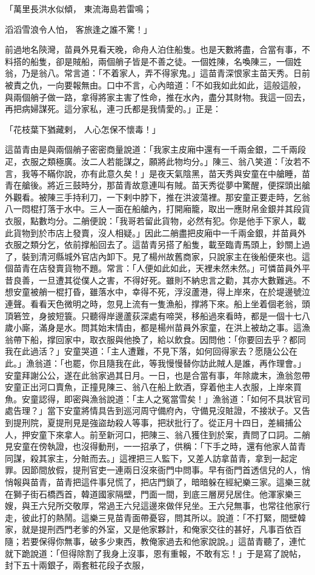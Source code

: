 \begin{showcontents}{}
「萬里長洪水似傾，  東流海島若雷鳴；

滔滔雪浪令人怕，  客旅逢之誰不驚！」

前過地名陝灣，苗員外見看天晚，命舟人泊住船隻。也是天數將盡，合當有事，不料搭的船隻，卻是賊船，兩個艄子皆是不善之徒。一個姓陳，名喚陳三，一個姓翁，乃是翁八。常言道：「不着家人，弄不得家鬼。」這苗青深恨家主苗天秀。日前被責之仇，一向要報無由。口中不言，心內暗道：「不如我如此如此，這般這般，與兩個艄子做一路，拿得將家主害了性命，推在水內，盡分其財物。我這一回去，再把病婦謀死。這分家私，連刁氏都是我情愛的。」正是：

「花枝葉下猶藏剌，  人心怎保不懷毒！」

這苗青由是與兩個艄子密密商量說道：「我家主皮廂中還有一千兩金銀，二千兩段疋，衣服之類極廣。汝二人若能謀之，願將此物均分。」陳三、翁八笑道：「汝若不言，我等不瞞你說，亦有此意久矣！」是夜天氣陰黑，苗天秀與安童在中艙睡，苗青在艙後。將近三鼓時分，那苗青故意連叫有賊。苗天秀從夢中驚醒，便探頭出艙外觀看。被陳三手持利刀，一下剌中脖下，推在洪波蕩裡。那安童正要走時，乞翁八一悶棍打落于水中。三人一面在船艙內，打開廂籠，取出一應財帛金銀并其段貨衣服，點數均分。二艄便說：「我哥若留此貨物，必然有犯。你是他手下家人，載此貨物到於市店上發賣，沒人相疑。」因此二艄盡把皮廂中一千兩金銀，并苗員外衣服之類分乞，依前撑船回去了。這苗青另搭了船隻，載至臨青馬頭上，鈔關上過了，裝到清河縣城外官店內卸下。見了楊州故舊商家，只說家主在後船便來也。這個苗青在店發賣貨物不題。常言：「人便如此如此，天裡未然未然。」可憐苗員外平昔良善，一旦遭其從僕人之害，不得好死。雖則不納忠言之勸，其亦大數難逃。不想安童被艄一棍打昏，雖落水中，幸得不死，浮沒蘆港，得上岸來，在於堤邊號泣連聲。看看天色微明之時，忽見上流有一隻漁船，撑將下來。船上坐着個老翁，頭頂箬笠，身披短簑。只聽得岸邊蘆荻深處有啼哭，移船過來看時，都是一個十七八歲小廝，滿身是水。問其始末情由，都是楊州苗員外家童，在洪上被劫之事。這漁翁帶下船，撑回家中，取衣服與他換了，給以飲食。因問他：「你要回去乎？都同我在此過活？」安童哭道：「主人遭難，不見下落，如何回得家去？愿隨公公在此。」漁翁道：「也罷，你且隨我在此，等我慢慢替你訪此賊人是誰，再作理會。」安童拜謝公公，遂在此翁家過其日月。一日，也是合當有事，年除歲末，漁翁忽帶安童正出河口賣魚，正撞見陳三、翁八在船上飲酒，穿着他主人衣服，上岸來買魚。安童認得，即密與漁翁說道：「主人之冤當雪矣！」漁翁道：「如何不具狀官司處告理？」當下安童將情具告到巡河周守備府內，守備見沒賍證，不接狀子。又告到提刑院，夏提刑見是強盜劫殺人等事，把狀批行了。從正月十四日，差緝捕公人，押安童下來拿人。前至新河口，把陳三、翁八獲住到於案，責問了口詞。二艄見安童在傍執證，也沒得動刑，一一招承了，供稱：「下手之時，還有他家人苗青同謀，殺其家主，分賍而去。」這裡把三人監下，又差人訪拿苗青，拿到一起定罪。因節間放假，提刑官吏一連兩日沒來衙門中問事。早有衙門首透信兒的人，悄悄報與苗青，苗青把這件事兒慌了，把店門鎖了，暗暗躲在經紀樂三家。這樂三就在獅子街石橋西首，韓道國家隔壁，門面一間，到底三層房兒居住。他渾家樂三嫂，與王六兒所交敬厚，常過王六兒這邊來做伴兒坐。王六兒無事，也常往他家行走，彼此打的熱鬧。這樂三見苗青面帶憂容，問其所以。說道：「不打緊，間壁韓家，就是提刑西門老爹的外室，又是他家夥計，和俺家交往的甚好，凡事百依百隨；若要保得你無事，破多少東西，教俺家過去和他家說說。」這苗青聽了，連忙就下跪說道：「但得除割了我身上沒事，恩有重報，不敢有忘！」于是寫了說帖，封下五十兩銀子，兩套粧花段子衣服，
\end{showcontents}
